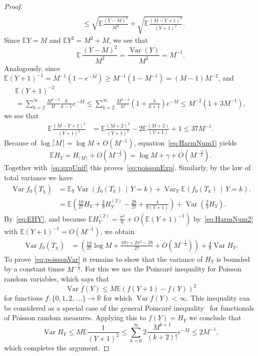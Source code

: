 \documentclass[10pt]{amsart}
\theoremstyle{definition}\newtheorem{defi}[theo]{Definition}\newtheorem{rema}[theo]{Remark}\newtheorem{exam}[theo]{Example}\newtheorem{exem}[theo]{Example}\newtheorem{nota}[theo]{Notation}
\newcommand{\var}{\operatorname{Var}}
\newcommand{\bbR}{\mathbb{R}}
\newcommand{\bbE}{\mathbb{E}}
\begin{document}
\begin{proof}
\begin{align*}
\\ & \leq
\sqrt{\bbE \frac {(Y-M)^2}{M^2}} + \sqrt{\bbE \frac {(M-Y+1)^2}{(Y+1)^2}}.
\end{align*}
Since $\bbE Y=M$ and $\bbE Y^2 = M^2 + M $, we see that
\[
\bbE \, \frac{(Y-M)^2}{M^2} = \frac{\var(Y)}{M^2}= M^{-1}.
\]
Analogously, since $
\bbE (Y+1)^{-1} = M^{-1} (1 - e^{-M})
\geq M^{-1} (1- M^{-1}) = (M-1) M^{-2} $, and
\begin{multline*}
\bbE (Y+1)^{-2} \\
= \sum_{k=2}^\infty \frac {M^{k-2}} {k!} \frac {k} {k-1} e^{-M}
\leq
\sum_{k=2}^\infty \frac {M^{k-2}} {k!} \left(1+\frac {3} {k+1} \right) e^{-M}
\leq M^{-2} \left(1+ 3 M^{-1}\right),
\end{multline*}
we see that
\begin{align*}
\bbE \frac {(M-Y+1)^2}{(Y+1)^2} &=
\bbE \frac {(M+2)^2}{(Y+1)^2} -2 \bbE \frac {(M+2)}{(Y+1)} + 1
\leq 37 M^{-1}.
\end{align*}
Because of $\log \lceil M\rceil= \log M + O(M^{-1})$, equation~\eqref{eq:HarmNum1} yields
\begin{equation}\label{eq:EHY}
\bbE H_Y = H_{\lceil M\rceil} + O\left(M^{-\frac 12}\right) = \log M + \gamma + O\left(M^{-\frac 12}\right).
\end{equation}
Together with~\eqref{eq:expUnif} this proves~\eqref{eq:poissonExp}. Similarly, by the law of total variance we have
\begin{align*}
\var f_0(T_{\chi}) &=
\bbE_Y \var \left(f_0(T_{k})\,\middle|\,Y=k\right) + \var_Y \bbE \left(f_0(T_k)\,\middle|\,Y=k\right).
\\ &=
\bbE \left(\frac {10}{27} H_Y + \frac{4}{9} H^{(2)}_Y - \frac{28}{27 } + \frac{4}{9(Y+1)}\right) + \var \left(\frac 23 H_Y \right).
\end{align*}
By~\eqref{eq:EHY}, and because $ \bbE H^{(2)}_Y = \frac{\pi^2}6+O(\bbE (Y+1)^{-1})$ by~\eqref{eq:HarmNum2} with $\bbE (Y+1)^{-1} = O(M^{-1}) $, we obtain
\begin{align*}
\var f_0(T_{\chi}) &=
\left(\frac {10}{27} \log M + \frac{10 \gamma + 2\pi^2 - 28 }{27} + O\left(M^{-\frac 12}\right) \right) + \frac 49 \var H_Y.
\end{align*}
To prove~\eqref{eq:poissonVar} it remains to show that the variance of $H_Y$ is bounded by a constant times $M^{-\frac 12}$. For this we use the Poincaré inequality for Poisson random variables, which says that
\[
\var f(Y) \leq M \bbE (f(Y+1)-f(Y))^2
\]
for functions $f:\{0,1,2,\,\ldots\}\to\bbR$ for which $\var f(Y)<\infty$. This inequality can be considered as a special case of the general Poincaré inequality~\cite[Theorem~18.7]{LP} for functionals of Poisson random measures. Applying this to $f(Y)=H_Y$ we conclude that
\[
\var H_Y
\leq M \bbE \frac 1{(Y+1)^2}
\leq
\sum\limits_{k=0}^{\infty} 2 \frac{M^{k+1}}{(k+2)!} e^{-M} \leq 2 M^{-1},
\]
which completes the argument.
\end{proof}
\end{document}
